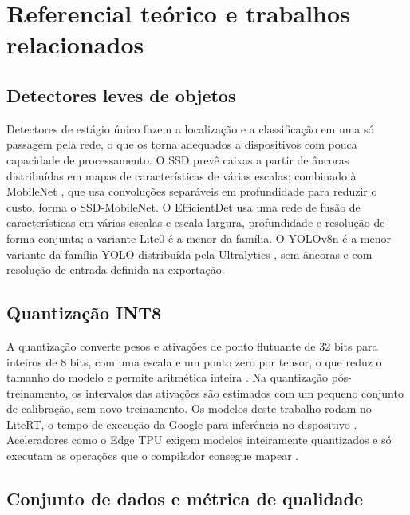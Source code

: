 \section{Referencial teórico e trabalhos relacionados}
\label{referencial}


\subsection{Detectores leves de objetos}

Detectores de estágio único fazem a localização e a classificação em uma só passagem pela rede, o que os torna adequados a dispositivos com pouca capacidade de processamento. O SSD \citep{liu2016ssd} prevê caixas a partir de âncoras distribuídas em mapas de características de várias escalas; combinado à MobileNet \citep{howard2017mobilenets}, que usa convoluções separáveis em profundidade para reduzir o custo, forma o SSD-MobileNet. O EfficientDet \citep{tan2020efficientdet} usa uma rede de fusão de características em várias escalas e escala largura, profundidade e resolução de forma conjunta; a variante Lite0 é a menor da família. O YOLOv8n é a menor variante da família YOLO distribuída pela Ultralytics \citep{jocher2023yolo}, sem âncoras e com resolução de entrada definida na exportação.

\subsection{Quantização INT8}

A quantização converte pesos e ativações de ponto flutuante de 32 bits para inteiros de 8 bits, com uma escala e um ponto zero por tensor, o que reduz o tamanho do modelo e permite aritmética inteira \citep{jacob2018quantization}. Na quantização pós-treinamento, os intervalos das ativações são estimados com um pequeno conjunto de calibração, sem novo treinamento. Os modelos deste trabalho rodam no LiteRT, o tempo de execução da Google para inferência no dispositivo \citep{litert2026}. Aceleradores como o Edge TPU exigem modelos inteiramente quantizados e só executam as operações que o compilador consegue mapear \citep{coral2026compiler}.

\subsection{Conjunto de dados e métrica de qualidade}

